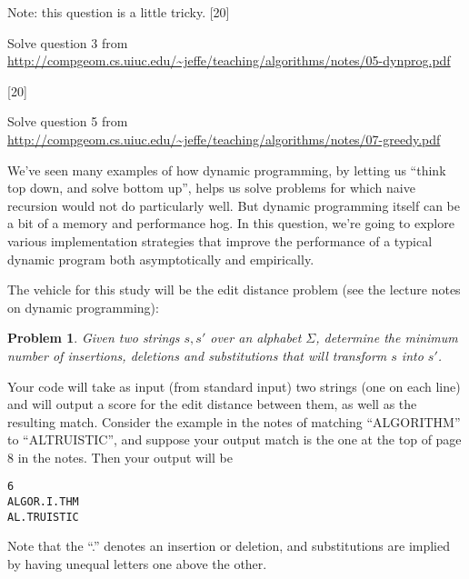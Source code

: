 \documentclass[addpoints]{exam}
\newtheorem*{problem*}{Problem}
\begin{document}
\begin{questions}
Note: this question is a little tricky. 
[20]

Solve question 3 from \url{http://compgeom.cs.uiuc.edu/~jeffe/teaching/algorithms/notes/05-dynprog.pdf}

[20]

Solve question 5 from \url{http://compgeom.cs.uiuc.edu/~jeffe/teaching/algorithms/notes/07-greedy.pdf}


We've seen many examples of how dynamic programming, by letting us ``think top down, and solve bottom up'', helps us solve problems for which naive recursion would not do particularly well. But dynamic programming itself can be a bit of a memory and performance hog. In this question, we're going to explore various implementation strategies that improve the performance of a typical dynamic program both asymptotically and empirically.

The vehicle for this study will be the edit distance problem (see the lecture notes on dynamic programming):
\begin{problem*}
  Given two strings $s, s'$ over an alphabet $\Sigma$, determine the minimum number of insertions, deletions and substitutions that will transform $s$ into $s'$. 
\end{problem*}

Your code will take as input (from standard input) two strings (one on each line) and will output a score for the edit distance between them, as well as the resulting match. Consider the example in the notes of matching ``ALGORITHM'' to ``ALTRUISTIC'', and suppose your output match is the one at the top of page 8 in the notes. Then your output will be

\begin{verbatim}
6
ALGOR.I.THM
AL.TRUISTIC
\end{verbatim}
Note that the ``.'' denotes an insertion or deletion, and substitutions are implied by having unequal letters one above the other. 
\begin{parts}

\end{parts}
\end{questions}
\end{document}
